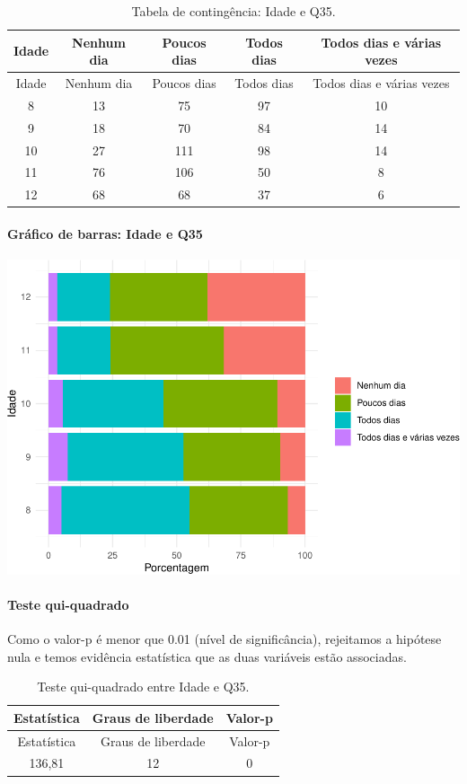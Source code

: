 \documentclass[]{article}
\let\oldparagraph\paragraph
\renewcommand{\paragraph}[1]{\oldparagraph{#1}\mbox{}}
\begin{document}
\begin{longtable}[]{@{}ccccc@{}}
\caption{\label{tab:unnamed-chunk-1271}Tabela de contingência: Idade e Q35.}\tabularnewline
\toprule
Idade & Nenhum dia & Poucos dias & Todos dias & Todos dias e várias vezes\tabularnewline
\midrule
\endfirsthead
\toprule
Idade & Nenhum dia & Poucos dias & Todos dias & Todos dias e várias vezes\tabularnewline
\midrule
\endhead
8 & 13 & 75 & 97 & 10\tabularnewline
9 & 18 & 70 & 84 & 14\tabularnewline
10 & 27 & 111 & 98 & 14\tabularnewline
11 & 76 & 106 & 50 & 8\tabularnewline
12 & 68 & 68 & 37 & 6\tabularnewline
\bottomrule
\end{longtable}

\hypertarget{gruxe1fico-de-barras-idade-e-q35}{%
\paragraph{Gráfico de barras: Idade e Q35}\label{gruxe1fico-de-barras-idade-e-q35}}

\begin{center}\includegraphics[width=0.75\linewidth]{relatorio_covid19_files/figure-latex/unnamed-chunk-1272-1} \end{center}

\hypertarget{teste-qui-quadrado-109}{%
\paragraph{Teste qui-quadrado}\label{teste-qui-quadrado-109}}

Como o valor-p é menor que 0.01 (nível de significância), rejeitamos a hipótese nula e temos evidência estatística que as duas variáveis estão associadas.

\begin{longtable}[]{@{}ccc@{}}
\caption{\label{tab:unnamed-chunk-1274}Teste qui-quadrado entre Idade e Q35.}\tabularnewline
\toprule
Estatística & Graus de liberdade & Valor-p\tabularnewline
\midrule
\endfirsthead
\toprule
Estatística & Graus de liberdade & Valor-p\tabularnewline
\midrule
\endhead
136,81 & 12 & 0\tabularnewline
\bottomrule
\end{longtable}
\end{document}
